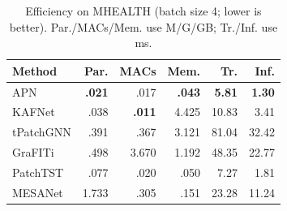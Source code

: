 \begin{table}[t]
\centering
\setlength{\tabcolsep}{2.2pt}
\caption{Efficiency on MHEALTH (batch size 4; lower is better). Par./MACs/Mem. use M/G/GB; Tr./Inf. use ms.}
\label{tab:v665-efficiency}
\begin{tabular}{@{}lrrrrr@{}}
\toprule
Method & Par. & MACs & Mem. & Tr. & Inf. \\
\midrule
APN       & \textbf{.021} & .017 & \textbf{.043} & \textbf{5.81} & \textbf{1.30} \\
KAFNet    & .038 & \textbf{.011} & 4.425 & 10.83 & 3.41 \\
tPatchGNN & .391 & .367 & 3.121 & 81.04 & 32.42 \\
GraFITi   & .498 & 3.670 & 1.192 & 48.35 & 22.77 \\
PatchTST  & .077 & .020 & .050 & 7.27 & 1.81 \\
MESANet   & 1.733 & .305 & .151 & 23.28 & 11.24 \\
\bottomrule
\end{tabular}
\end{table}
